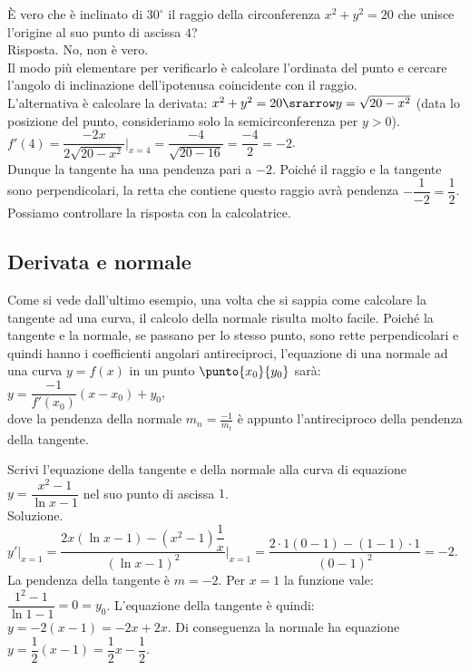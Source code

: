 \begin{esempio}
  È vero che è inclinato di $30^\circ$ il raggio  
  della circonferenza $x^2+y^2=20$ che unisce l'origine al suo punto di ascissa
  $4$?\\
  Risposta. No, non è vero. \\
  Il modo più elementare per verificarlo è calcolare l'ordinata
  del punto e cercare l'angolo di inclinazione dell'ipotenusa coincidente con 
  il raggio.\\
  L'alternativa è calcolare la derivata:
  $x^2+y^2=20\srarrow y=\sqrt{20-x^2}$ (data lo posizione del punto,
  consideriamo solo la semicirconferenza per $y>0$).\\
  $f'(4)= \dfrac{-2x}{2\sqrt{20-x^2}}\bigg|_{x=4}=\dfrac{-4}{\sqrt{20-16}}=
  \dfrac{-4}{2}=-2$.\\
  Dunque la tangente ha una pendenza pari a $-2$. Poiché il raggio e la 
  tangente sono perpendicolari, la retta che contiene questo raggio avrà 
  pendenza $-\dfrac{1}{-2}=\dfrac{1}{2}$.\\
  Possiamo controllare la risposta con la calcolatrice.
  \end{esempio}
 
\subsection{Derivata e normale}
\label{}
Come si vede dall'ultimo esempio, una volta che si sappia come calcolare 
la tangente ad una curva, il calcolo della normale risulta molto facile.
Poiché la tangente e la normale, se passano per lo stesso punto, sono rette
perpendicolari e quindi hanno i coefficienti angolari antireciproci,
l'equazione di una normale ad una curva $y=f(x)$ in un punto $\punto{x_0}{y_0}$
sarà:\\
$y=\dfrac{-1}{f'(x_0)}(x-x_0)+y_0$,\\
dove la pendenza della normale $m_n=\frac{-1}{m_t}$ è appunto l'antireciproco
della pendenza della tangente.

\begin{esempio}
Scrivi l'equazione della tangente e della normale alla curva di equazione
$y=\dfrac{x^2-1}{\ln x -1}$ nel suo punto di ascissa $1$.\\
Soluzione. $y'|_{x=1}=\dfrac{2x(\ln x-1)-(x^2-1)\dfrac{1}{x}}
{(\ln x -1)^2}\bigg|_{x=1}=\dfrac{2\cdot 1(0-1)-(1-1)\cdot 1}{(0-1)^2}=-2$.\\
La pendenza della tangente è $m=-2$. Per $x=1$ la funzione vale:
$\dfrac{1^2-1}{\ln 1 -1}=0=y_0$. L'equazione della tangente è quindi:
$y=-2(x-1)=-2x+2x$. Di conseguenza la normale ha equazione $y=\dfrac{1}{2}(x-1)
=\dfrac{1}{2}x-\dfrac{1}{2}$.
\end{esempio}


